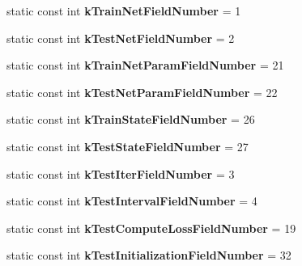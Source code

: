 \begin{DoxyCompactItemize}
static const int {\bfseries k\+Train\+Net\+Field\+Number} = 1
\item 
\mbox{\label{classcaffe_1_1_solver_parameter_ae6074a832a8be2abd0f411d4de24d671}} 
static const int {\bfseries k\+Test\+Net\+Field\+Number} = 2
\item 
\mbox{\label{classcaffe_1_1_solver_parameter_ac3d1dc3ae8132619cd6663b404325ea2}} 
static const int {\bfseries k\+Train\+Net\+Param\+Field\+Number} = 21
\item 
\mbox{\label{classcaffe_1_1_solver_parameter_a3eb5b05957a5d9f19a8a1f013bf560f9}} 
static const int {\bfseries k\+Test\+Net\+Param\+Field\+Number} = 22
\item 
\mbox{\label{classcaffe_1_1_solver_parameter_ac9f1c93a05173cf56a9453eb10e5b0de}} 
static const int {\bfseries k\+Train\+State\+Field\+Number} = 26
\item 
\mbox{\label{classcaffe_1_1_solver_parameter_a93520532acd3c6ea3392946ed534fe9a}} 
static const int {\bfseries k\+Test\+State\+Field\+Number} = 27
\item 
\mbox{\label{classcaffe_1_1_solver_parameter_a7e507893e82f5e91d885440d70dbbd3f}} 
static const int {\bfseries k\+Test\+Iter\+Field\+Number} = 3
\item 
\mbox{\label{classcaffe_1_1_solver_parameter_acc9c7311d95409354e105eac701bf2de}} 
static const int {\bfseries k\+Test\+Interval\+Field\+Number} = 4
\item 
\mbox{\label{classcaffe_1_1_solver_parameter_a22325d1891cfdaa8898b2a5abc891fa9}} 
static const int {\bfseries k\+Test\+Compute\+Loss\+Field\+Number} = 19
\item 
\mbox{\label{classcaffe_1_1_solver_parameter_a78f303d051ed16653dbe0da5eb80101b}} 
static const int {\bfseries k\+Test\+Initialization\+Field\+Number} = 32
\item 
\mbox{\label{classcaffe_1_1_solver_parameter_ab3d49894b5795e7dce0566e0724c3011}} 

\end{DoxyCompactItemize}
